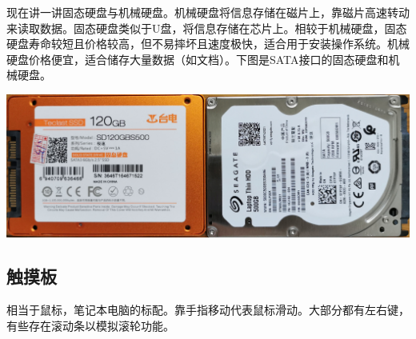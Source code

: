 现在讲一讲固态硬盘与机械硬盘。机械硬盘将信息存储在磁片上，靠磁片高速转动来读取数据。固态硬盘类似于U盘，将信息存储在芯片上。相较于机械硬盘，固态硬盘寿命较短且价格较高，但不易摔坏且速度极快，适合用于安装操作系统。机械硬盘价格便宜，适合储存大量数据（如文档）。下图是SATA接口的固态硬盘和机械硬盘。
\begin{center}
	\includegraphics[scale=0.1]{pic/HD}
\end{center} 
\subsection{触摸板}
相当于鼠标，笔记本电脑的标配。靠手指移动代表鼠标滑动。大部分都有左右键，有些存在滚动条以模拟滚轮功能。
